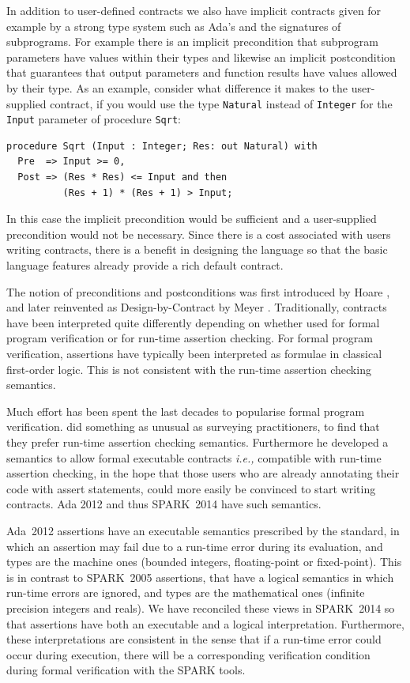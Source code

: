 \documentclass[sttt,final]{svjour}
\newcommand{\oldspark}{SPARK~2005\xspace}
\newcommand{\newspark}{SPARK~2014\xspace}
\newcommand{\adatwtw}{Ada~2012\xspace}
\newcommand{\ie}{\textit{i.e.,}\xspace}
\begin{document}
In addition to user-defined contracts we also have implicit contracts
given for example by a strong type system such as Ada's and the
signatures of subprograms. For example there is an implicit
precondition that subprogram parameters have values within their types
and likewise an implicit postcondition that guarantees that output
parameters and function results have values allowed by their type. As
an example, consider what difference it makes to the user-supplied
contract, if you would use the type \verb|Natural| instead of
\verb|Integer| for the \verb|Input| parameter of procedure \verb|Sqrt|:
%
\begin{lstlisting}
procedure Sqrt (Input : Integer; Res: out Natural) with
  Pre  => Input >= 0,
  Post => (Res * Res) <= Input and then
          (Res + 1) * (Res + 1) > Input;
\end{lstlisting}
%
In this case the implicit precondition would be sufficient and a
user-supplied precondition would not be necessary. Since there is a
cost associated with users writing contracts, there is a benefit in
designing the language so that the basic language features already
provide a rich default contract.

The notion of preconditions and postconditions was first introduced by Hoare
\cite{hoare69cacm}, and later reinvented as Design-by-Contract by Meyer
\cite{meyer:1988:OSC}. Traditionally, contracts have been interpreted quite
differently depending on whether used for formal program verification or for
run-time assertion checking. For formal program verification, assertions have
typically been interpreted as formulae in classical first-order logic. This is
not consistent with the run-time assertion checking semantics.

Much effort has been spent the last decades to popularise formal
program verification. \cite{tseChalin10} did something as unusual as
surveying practitioners, to find that they prefer run-time assertion
checking semantics. Furthermore he developed a semantics to allow
formal executable contracts \ie compatible with run-time assertion
checking, in the hope that those users who are already annotating
their code with assert statements, could more easily be convinced to
start writing contracts. Ada 2012 and thus \newspark have such
semantics.

\adatwtw assertions have an executable semantics prescribed by the
standard, in which an assertion may fail due to a run-time error during its
evaluation, and types are the machine ones (bounded integers,
floating-point or fixed-point). This is in contrast to \oldspark
assertions, that have a logical semantics in which run-time errors are
ignored, and types are the mathematical ones (infinite precision integers
and reals). We have reconciled these views in \newspark so that assertions
have both an executable and a logical interpretation. Furthermore, these
interpretations are consistent in the sense that if a run-time error could
occur during execution, there will be a corresponding verification
condition during formal verification with the SPARK tools.
\end{document}
